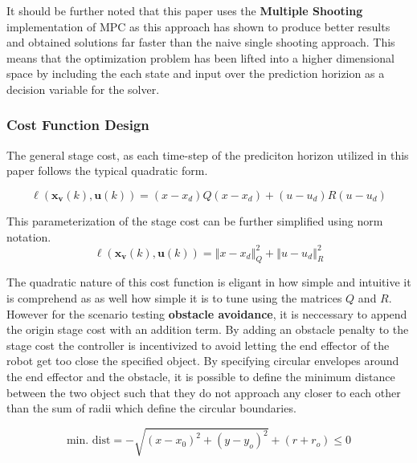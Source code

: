 \documentclass[journal]{IEEEtran}
\begin{document}
It should be further noted that this paper uses the \textbf{Multiple Shooting} implementation of MPC as this approach has shown to produce better results and obtained solutions far faster than the naive single shooting approach. This means that the optimization problem has been lifted into a higher dimensional space by including the each state and input over the prediction horizion as a decision variable for the solver. \\

\subsubsection{Cost Function Design}

The general stage cost, as each time-step of the prediciton horizon utilized in this paper follows the typical quadratic form.

\begin{equation}
  \ell\left(\mathbf{x}_{\mathbf{v}}(k), \mathbf{u}(k)\right) = (x-x_d)Q(x-x_d) + (u-u_d)R(u-u_d)
\end{equation}

This parameterization of the stage cost can be further simplified using norm notation.
\begin{equation}\label{eq:norm_cost}
  \ell\left(\mathbf{x}_{\mathbf{v}}(k), \mathbf{u}(k)\right) = \left\Vert x - x_d \right\Vert^{2}_{Q} + \left\Vert u -u_d \right\Vert^{2}_{R}
\end{equation}

The quadratic nature of this cost function is eligant in how simple and intuitive it is comprehend as as well how simple it is to tune using the matrices $Q$ and $R$. \\

However for the scenario testing \textbf{obstacle avoidance}, it is neccessary to append the origin stage cost with an addition term. By adding an obstacle penalty to the stage cost the controller is incentivized to avoid letting the end effector of the robot get too close the specified object. By specifying circular envelopes around the end effector and the obstacle, it is possible to define the minimum distance between the two object such that they do not approach any closer to each other than the sum of radii which define the circular boundaries.

\begin{equation}
\text{min. dist} = -\sqrt{\left(x-x_{0}\right)^{2}+\left(y-y_{o}\right)^{2}}+\left(r+r_{o}\right) \leq 0
\end{equation}
\end{document}

